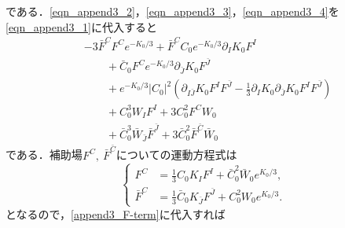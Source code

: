 \documentclass[a4paper,uplatex,dvipdfmx,10pt]{jsarticle}
\theoremstyle{definition}
\begin{document}
である．\eqref{eqn_append3_2}，\eqref{eqn_append3_3}，\eqref{eqn_append3_4}を\eqref{eqn_append3_1}に代入すると
\begin{align}
   &
   -
   3\bar{F}^{C}F^{C}e^{-K_{0}/3}
   +
   \bar{F}^{C}C_{0}e^{-K_{0}/3}\partial_{I}K_{0}F^{I}
   \nonumber
   \\
   &\qquad
   +
   \bar{C}_{0}F^{C}e^{-K_{0}/3}\partial_{\bar{J}}K_{0}F^{\bar{J}}
   \nonumber
   \\
   &\qquad
   +
   e^{-K_{0}/3}|C_{0}|^2
   \left(
       \partial_{I\bar{J}}K_{0}F^{I}F^{\bar{J}}
       -
       \frac{1}{3}\partial_{I}K_{0}\partial_{\bar{J}}K_{0}F^{I}F^{\bar{J}}
   \right)
   \nonumber
   \\
   &\qquad
   +
   C_{0}^3W_{I}F^{I}
   +
   3C_{0}^{2}F^{C}W_{0}
   \nonumber
   \\
   &\qquad
   +
   \bar{C}_{0}^{3}\bar{W}_{\bar{J}}\bar{F}^{\bar{J}}
   +
   3\bar{C}_{0}^{2}\bar{F}^{\bar{C}}\bar{W}_{0}
   \label{append3_F-term}
\end{align}
である．補助場$F^{C},\ \bar{F}^{\bar{C}}$についての運動方程式は
\begin{equation}
    \left\{ 
    \begin{alignedat}{1}
        F^{C}
        &=
        \frac{1}{3}C_{0}K_{I}F^{I}
        +
        \bar{C}_{0}^{2}\bar{W}_{0}e^{K_{0}/3}
        ,
        \\
        \bar{F}^{C}
        &=
        \frac{1}{3}\bar{C}_{0}K_{\bar{J}}F^{\bar{J}}
        +
        C_{0}^{2}W_{0}e^{K_{0}/3}
        .            
    \end{alignedat}
    \right.
    \nonumber
\end{equation}
となるので，\eqref{append3_F-term}に代入すれば
\end{document}
